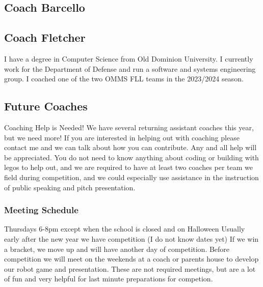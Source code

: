 \documentclass[letter]{article}
\begin{document}
\hypertarget{coach-barcello}{%
\subsection{Coach Barcello}\label{coach-barcello}}

\hypertarget{coach-fletcher}{%
\subsection{Coach Fletcher}\label{coach-fletcher}}

I have a degree in Computer Science from Old Dominion University. I currently work for the Department of Defense and run a software and systems engineering group. I coached one of the two OMMS FLL teams in the 2023/2024 season.

\hypertarget{future-coaches}{%
\subsection{Future Coaches}\label{future-coaches}}

Coaching Help is Needed! We have several returning assistant coaches
this year, but we need more! If you are interested in helping out with
coaching please contact me and we can talk about how you can contribute.
Any and all help will be appreciated. You do not need to know anything about coding or building with legos to help out, and we are required to have at least two coaches per team we field during competition, and we could especially use assistance in the instruction of public speaking and pitch presentation.

\hypertarget{meeting-schedule}{%
\subsubsection{Meeting Schedule}\label{meeting-schedule}}

Thursdays 6-8pm except when the school is closed and on Halloween Usually
early after the new year we have competition (I do not know dates yet)
If we win a bracket, we move up and will have another day of
competition. Before competition we will meet on the weekends at a coach
or parents house to develop our robot game and presentation. These are
not required meetings, but are a lot of fun and very helpful for last
minute preparations for competion.
\end{document}
